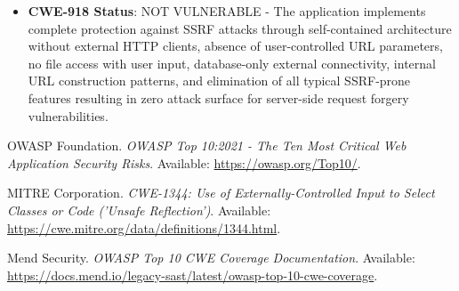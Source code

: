 \documentclass[]{UCD_CS_FYP_Report}
\begin{document}
\begin{itemize}
	\item \textbf{CWE-918 Status}: NOT VULNERABLE - The application implements complete protection against SSRF attacks through self-contained architecture without external HTTP clients, absence of user-controlled URL parameters, no file access with user input, database-only external connectivity, internal URL construction patterns, and elimination of all typical SSRF-prone features resulting in zero attack surface for server-side request forgery vulnerabilities.
\end{itemize}



\newpage
\begin{thebibliography}{99}
 OWASP Foundation. \emph{OWASP Top 10:2021 - The Ten Most Critical Web Application Security Risks}. Available: \url{https://owasp.org/Top10/}.

 MITRE Corporation. \emph{CWE-1344: Use of Externally-Controlled Input to Select Classes or Code ('Unsafe Reflection')}. Available: \url{https://cwe.mitre.org/data/definitions/1344.html}.

 Mend Security. \emph{OWASP Top 10 CWE Coverage Documentation}. Available: \url{https://docs.mend.io/legacy-sast/latest/owasp-top-10-cwe-coverage}.
\end{thebibliography}
\label{endpage}
\end{document}
